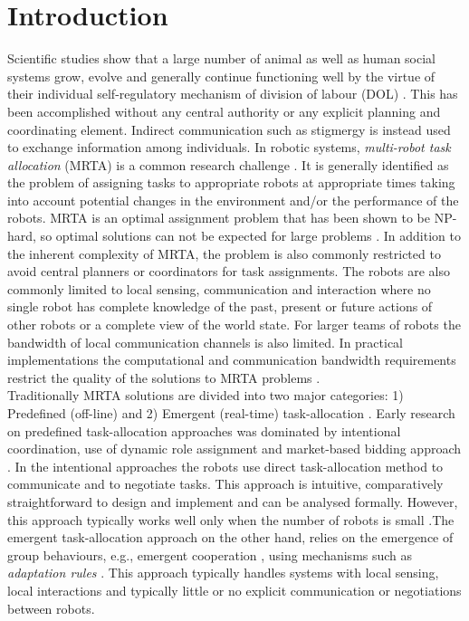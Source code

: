 \documentclass{llncs}
\begin{document}
\section{Introduction}
\label{sec:intro}
Scientific studies show that a large number of animal as well as human social systems grow, evolve and generally continue functioning well by the virtue of their individual self-regulatory mechanism of division of labour (DOL)  \cite{Bonabeau+1999}.
This has been accomplished without any central authority or any explicit planning and coordinating element.
Indirect communication such as stigmergy is instead used to exchange information among individuals. 
In robotic systems, \textit{multi-robot task allocation} (MRTA) is a common research challenge \cite{Gerkey+2004}.
It is generally identified as the problem of assigning tasks to appropriate robots at appropriate times taking into account potential changes in the environment and/or the performance of the robots.
MRTA is an optimal assignment problem that has been shown to be NP-hard, so optimal solutions can not be expected for large problems \cite{Parker2008}.
In addition to the inherent complexity of MRTA, the problem is also commonly restricted to avoid central planners or coordinators for task assignments.
The robots are also commonly limited to local sensing, communication and interaction \cite{Lerman+2006} where no single robot has complete knowledge of the past, present or future actions of other robots or a complete view of the world state.
For larger teams of robots the bandwidth of local communication channels is also limited.
In practical implementations the computational and communication bandwidth requirements restrict the quality of the solutions to MRTA problems \cite{Gerkey+2004,Lerman+2006}.\\
Traditionally MRTA solutions are divided into two major categories: 1) Predefined (off-line) and 2) Emergent (real-time) task-allocation \cite{Shen+2001}. Early research on predefined task-allocation approaches was dominated by intentional coordination, use of dynamic role assignment \cite{Parker2008} and market-based bidding approach \cite{Dias+2006}.
In the intentional approaches the robots use direct task-allocation method to communicate and to negotiate tasks.
This approach is intuitive, comparatively straightforward to design and implement and can be analysed formally.
However, this approach typically works well only when the number of robots is small \cite{Lerman+2006}.The emergent task-allocation approach on the other hand, relies on the emergence of group behaviours, e.g., emergent cooperation \cite{Lerman+2006}, using mechanisms such as {\em adaptation rules} \cite{Liu+2007}. This approach typically handles systems with local sensing, local interactions and typically little or no explicit communication or negotiations between robots.
\end{document}
